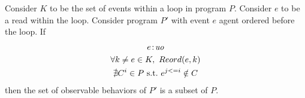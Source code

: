             \begin{corollary}
                \label{LoopInvCodeMotRead2}
                Consider $K$ to be the set of events within a loop in program $P$. Consider $e$ to be a read within the loop. Consider program $P'$ with event $e$ agent ordered before the loop. If
                \begin{gather*}
                    e\!:\!\textit{uo} \\
                    \forall k \neq e \in K, \ Reord(e, k) \\ 
                    \nexists C^i \in P \ \text{s.t.} \ e^{j<=i} \notin C                      
                \end{gather*}
                then the set of observable behaviors of $P'$ is a subset of $P$.
            \end{corollary}
            
